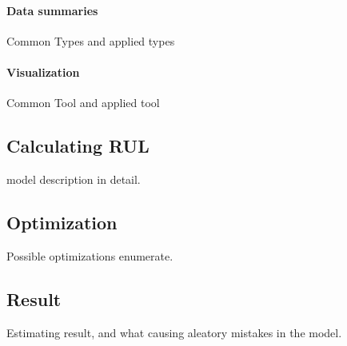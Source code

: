 		\paragraph{Data summaries}
		Common Types and applied types
		\paragraph{Visualization}
		Common Tool and applied tool
	\subsection{Calculating RUL}
model description in detail.
	\subsection{Optimization}
Possible optimizations enumerate.
	\subsection{Result}
Estimating result, and what causing aleatory mistakes in the model. 
